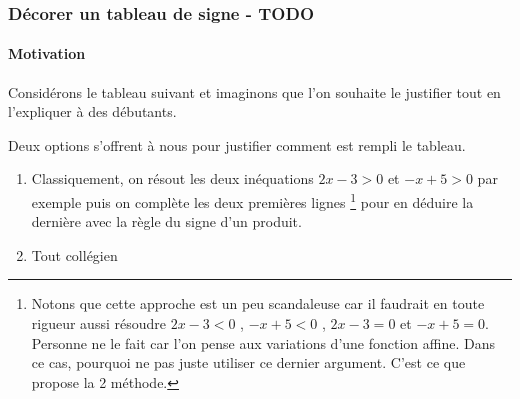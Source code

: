 \documentclass[12pt,a4paper]{article}
\begin{document}


\subsubsection{Décorer un tableau de signe - TODO}

\paragraph{Motivation}

Considérons le tableau suivant et imaginons que l'on souhaite le justifier tout en l'expliquer à des débutants.

\begin{center}
\end{center}
Deux options s'offrent à nous pour justifier comment est rempli le tableau.
\begin{enumerate}
    \item Classiquement, on résout les deux inéquations $2 x - 3 > 0$ et $-x + 5 > 0$ par exemple puis on complète les deux premières lignes 
    \footnote{
        Notons que cette approche est un peu scandaleuse car il faudrait en toute rigueur aussi résoudre
        $2 x - 3 < 0$ , $-x + 5 < 0$ , $2 x - 3 = 0$ et $-x + 5 = 0$.
        Personne ne le fait car l'on pense aux variations d'une fonction affine. Dans ce cas, pourquoi ne pas juste utiliser ce dernier argument. C'est ce que propose la 2\ieme{} méthode. 
    }
    pour en déduire la dernière avec la règle du signe d'un produit.

    \item Tout collégien 
\end{enumerate}
\end{document}
